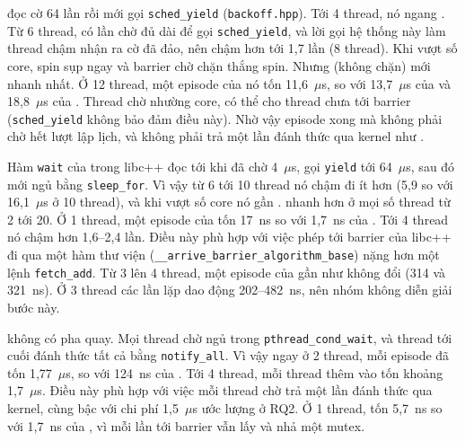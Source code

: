  đọc cờ 64 lần rồi mới gọi \texttt{sched\_yield} (\texttt{backoff.hpp}). Tới 4
thread, nó ngang . Từ 6 thread, có lần chờ đủ dài để gọi \texttt{sched\_yield}, và lời gọi hệ
thống này làm thread chậm nhận ra cờ đã đảo, nên  chậm hơn  tới 1,7 lần
(8 thread). Khi vượt số core, spin sụp ngay và barrier chờ chặn thắng spin. Nhưng 
(không chặn) mới nhanh nhất. Ở 12 thread, một episode của nó tốn 11,6~$\mu$s, so với 13,7~$\mu$s của
 và 18,8~$\mu$s của . Thread chờ nhường core, có thể cho thread chưa
tới barrier (\texttt{sched\_yield} không bảo đảm điều này). Nhờ vậy episode xong mà không phải chờ hết
lượt lập lịch, và không phải trả một lần đánh thức qua kernel như .

Hàm \texttt{wait} của  trong libc++ đọc tới khi đã chờ 4~$\mu$s, gọi
\texttt{yield} tới 64~$\mu$s, sau đó mới ngủ bằng \texttt{sleep\_for}. Vì vậy từ 6 tới 10 thread nó chậm
đi ít hơn  (5,9 so với 16,1~$\mu$s ở 10 thread), và khi vượt số core nó gần
.  nhanh hơn  ở mọi số thread từ 2 tới 20.
Ở 1 thread, một episode của  tốn 17~ns so với 1,7~ns của . Tới 4 thread
nó chậm hơn  1,6--2,4 lần. Điều này phù hợp với việc phép tới barrier của libc++ đi qua một
hàm thư viện (\texttt{\_\_arrive\_barrier\_algorithm\_base}) nặng hơn một lệnh \texttt{fetch\_add}. Từ 3
lên 4 thread, một episode của  gần như không đổi (314 và 321~ns). Ở 3 thread các
lần lặp dao động 202--482~ns, nên nhóm không diễn giải bước này.

 không có pha quay. Mọi thread chờ ngủ trong \texttt{pthread\_cond\_wait}, và thread tới
cuối đánh thức tất cả bằng \texttt{notify\_all}. Vì vậy ngay ở 2 thread, mỗi episode đã tốn 1,77~$\mu$s,
so với 124~ns của . Tới 4 thread, mỗi thread thêm vào tốn khoảng 1,7~$\mu$s. Điều này
phù hợp với việc mỗi thread chờ trả một lần đánh thức qua kernel, cùng bậc với chi phí 1,5~$\mu$s ước
lượng ở RQ2. Ở 1 thread,  tốn 5,7~ns so với 1,7~ns của , vì mỗi lần tới
barrier vẫn lấy và nhả một mutex.


